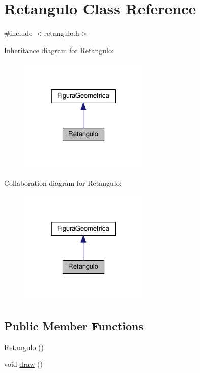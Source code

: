\hypertarget{class_retangulo}{}\section{Retangulo Class Reference}
\label{class_retangulo}


{\ttfamily \#include $<$retangulo.\+h$>$}



Inheritance diagram for Retangulo\+:
\nopagebreak
\begin{figure}[H]
\begin{center}
\leavevmode
\includegraphics[width=174pt]{class_retangulo__inherit__graph}
\end{center}
\end{figure}


Collaboration diagram for Retangulo\+:
\nopagebreak
\begin{figure}[H]
\begin{center}
\leavevmode
\includegraphics[width=174pt]{class_retangulo__coll__graph}
\end{center}
\end{figure}
\subsection*{Public Member Functions}
\begin{DoxyCompactItemize}
\item 
\hyperlink{class_retangulo_ac21a81cae046920c8bee401bcb879562}{Retangulo} ()
\item 
void \hyperlink{class_retangulo_a48cb75fe7cd048727879c25485976444}{draw} ()
\end{DoxyCompactItemize}


